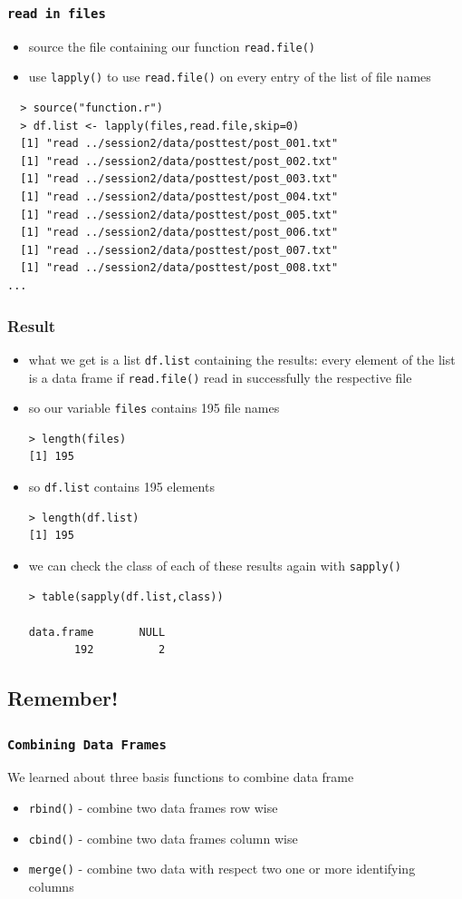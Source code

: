 \documentclass[xcolor={table},c]{beamer}
\begin{document}
\begin{frame}[fragile]\frametitle{\texttt{read in files}}
  \begin{itemize}
  \item source the file containing our function \texttt{read.file()}
  \item use \texttt{lapply()} to use \texttt{read.file()} on every entry of the list of file names
  \end{itemize}
\begin{verbatim}
  > source("function.r")
  > df.list <- lapply(files,read.file,skip=0)
  [1] "read ../session2/data/posttest/post_001.txt"
  [1] "read ../session2/data/posttest/post_002.txt"
  [1] "read ../session2/data/posttest/post_003.txt"
  [1] "read ../session2/data/posttest/post_004.txt"
  [1] "read ../session2/data/posttest/post_005.txt"
  [1] "read ../session2/data/posttest/post_006.txt"
  [1] "read ../session2/data/posttest/post_007.txt"
  [1] "read ../session2/data/posttest/post_008.txt"
...
\end{verbatim}
\end{frame}


\begin{frame}[fragile]\frametitle{Result}
\begin{itemize}
\item what we get is a list \texttt{df.list} containing the results: every element of the list is a data frame if \texttt{read.file()} read in successfully the respective file
\item so our variable \texttt{files} contains 195 file names
\begin{verbatim}
> length(files)
[1] 195  
\end{verbatim}
\item so \texttt{df.list} contains 195 elements
\begin{verbatim}
> length(df.list)
[1] 195  
\end{verbatim}
\item we can check the class of each of these results again with \texttt{sapply()}
\begin{verbatim}
> table(sapply(df.list,class))

data.frame       NULL 
       192          2   
\end{verbatim}
\end{itemize}
\end{frame}


\subsection{Remember!}
\begin{frame}[fragile]\frametitle{\texttt{Combining Data Frames}}
We learned about three basis functions to combine data frame
\begin{itemize}
\item \texttt{rbind()} - combine two data frames row wise
\item \texttt{cbind()} - combine two data frames column wise
\item \texttt{merge()} - combine two data with respect two one or more identifying columns
\end{itemize}
\end{frame}
\end{document}
